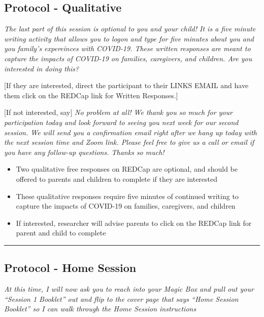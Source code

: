 \documentclass[]{book}
\providecommand{\tightlist}{%
  \setlength{\itemsep}{0pt}\setlength{\parskip}{0pt}}
\begin{document}
\hypertarget{protocol---qualitative}{%
\subsection{Protocol - Qualitative}\label{protocol---qualitative}}

\emph{The last part of this session is optional to you and your child! It is a five minute writing activity that allows you to logon and type for five minutes about you and you family's expereinces with COVID-19. These written responses are meant to capture the impacts of COVID-19 on families, caregivers, and children. Are you interested in doing this?}

{[}If they are interested, direct the participant to their LINKS EMAIL and have them click on the REDCap link for Written Responses.{]}

{[}If not interested, say{]} \emph{No problem at all! We thank you so much for your participation today and look forward to seeing you next week for our second session. We will send you a confirmation email right after we hang up today with the next session time and Zoom link. Please feel free to give us a call or email if you have any follow-up questions. Thanks so much!}

\begin{itemize}
\tightlist
\item
  Two qualitative free responses on REDCap are optional, and should be offered to parents and children to complete if they are interested
\item
  These qualitative responses require five minutes of continued writing to capture the impacts of COVID-19 on families, caregivers, and children
\item
  If interested, researcher will advise parents to click on the REDCap link for parent and child to complete
\end{itemize}

\begin{center}\rule{0.5\linewidth}{0.5pt}\end{center}

\hypertarget{protocol---home-session}{%
\subsection{Protocol - Home Session}\label{protocol---home-session}}

\emph{At this time, I will now ask you to reach into your Magic Box and pull out your ``Session 1 Booklet'' out and flip to the cover page that says ``Home Session Booklet'' so I can walk through the Home Session instructions}
\end{document}
